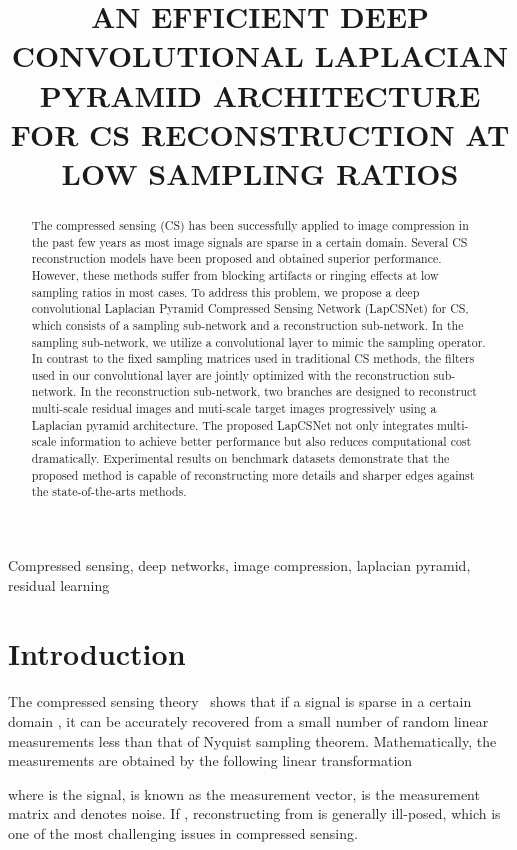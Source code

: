 \documentclass{article}
\title{AN EFFICIENT DEEP CONVOLUTIONAL LAPLACIAN PYRAMID ARCHITECTURE FOR CS RECONSTRUCTION AT LOW SAMPLING RATIOS}
\begin{document}
\maketitle
\begin{abstract}
The compressed sensing (CS) has been successfully applied to image compression in the past few years as most image signals are sparse in a certain domain. Several CS reconstruction models have been proposed and obtained superior performance. However, these methods suffer from blocking artifacts or ringing effects at low sampling ratios in most cases. To address this problem, we propose a deep convolutional Laplacian Pyramid Compressed Sensing Network (LapCSNet) for CS, which consists of a sampling sub-network and a reconstruction sub-network. In the sampling sub-network, we utilize a convolutional layer to mimic the sampling operator. In contrast to the fixed sampling matrices used in traditional CS methods, the filters used in our convolutional layer are jointly optimized with the reconstruction sub-network. In the reconstruction sub-network, two branches are designed to reconstruct multi-scale residual images and muti-scale target images progressively using a Laplacian pyramid architecture. The proposed LapCSNet not only integrates multi-scale information to achieve better performance but also reduces computational cost dramatically. Experimental results on benchmark datasets demonstrate that the proposed method is capable of reconstructing more details and sharper edges against the state-of-the-arts methods.
\end{abstract}
\begin{keywords}
Compressed sensing, deep networks, image compression, laplacian pyramid, residual learning
\end{keywords}
\section{Introduction}
\label{sec:intro}

The compressed sensing theory~\cite{candes2006robust, donoho2006compressed} shows that if a signal is sparse in a certain domain , it can be accurately recovered from a small number of random linear measurements less than that of Nyquist sampling theorem. Mathematically, the measurements are obtained by the following linear transformation

where  is the signal,  is known as the measurement vector,  is the measurement matrix and  denotes noise. If , reconstructing  from  is generally ill-posed, which is one of the most challenging issues in compressed sensing.
\end{document}
